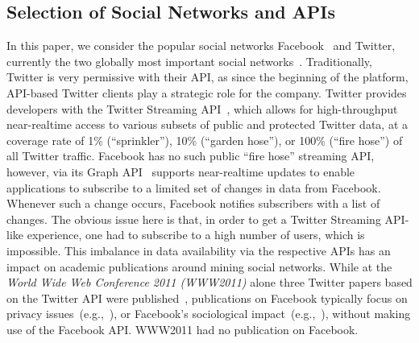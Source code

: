 \documentclass{iosart2c}
\begin{document}
\subsection{Selection of Social Networks and APIs}
In this paper, we consider the popular social networks Facebook~\cite{Facebook} and Twitter\cite{Twitter}, currently the two globally most important social networks~\cite{comScoreTwitter, comScoreFacebook}.
Traditionally, Twitter is very permissive with their API, as since the beginning of the platform, API-based Twitter clients play a strategic role for the company.
Twitter provides developers with the Twitter Streaming API~\cite{TwitterStreamingAPI}, which allows for high-throughput near-realtime access to various subsets of public and protected Twitter data, at a coverage rate of 1\% (``sprinkler''), 10\% (``garden hose''), or 100\% (``fire hose'') of all Twitter traffic.
Facebook has no such public ``fire hose'' streaming API, however, via its Graph API~\cite{FacebookRealtimeAPI} supports near-realtime updates to enable applications to subscribe to a limited set of changes in data from Facebook.
Whenever such a change occurs, Facebook notifies subscribers with a list of changes.
The obvious issue here is that, in order to get a Twitter Streaming API-like experience, one had to subscribe to a high number of users, which is impossible.
This imbalance in data availability via the respective APIs has an impact on academic publications around mining social networks.
While at the \textit{World Wide Web Conference 2011 (WWW2011)} alone three Twitter papers based on the Twitter API were published~\cite{Meeder:2011:WKY:1963405.1963479, Romero:2011:DMI:1963405.1963503, Wu:2011:SWT:1963405.1963504}, publications on Facebook typically focus on privacy issues~(e.g.,~\cite{liu:settings}), or Facebook's sociological impact~(e.g.,~\cite{JCC4:JCC4367}), without making use of the Facebook API.
WWW2011 had no publication on Facebook.
\end{document}
